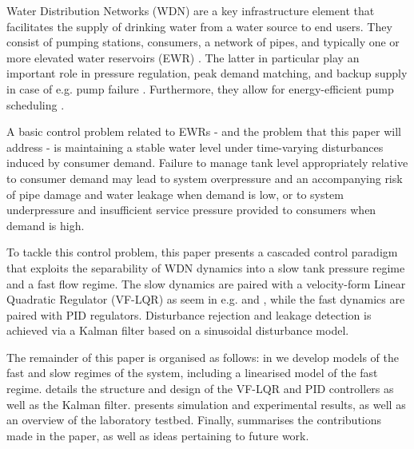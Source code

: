 
Water Distribution Networks (WDN) are a key infrastructure element that facilitates the supply of drinking water from a water source to end users. They consist of pumping stations, consumers, a network of pipes, and typically one or more elevated water reservoirs (EWR) \cite{Swamee2008}. The latter in particular play an important role in pressure regulation, peak demand matching, and backup supply in case of e.g. pump failure \cite{Val2020,Creaco2019}. Furthermore, they allow for energy-efficient pump scheduling \cite{Rathore1030,Bello2019}.  

A basic control problem related to EWRs - and the problem that this paper will address - is maintaining a stable water level under time-varying disturbances induced by consumer demand. Failure to manage tank level appropriately relative to consumer demand may lead to system overpressure and an accompanying risk of pipe damage and water leakage when demand is low, or to system underpressure and insufficient service pressure provided to consumers when demand is high. 

To tackle this control problem, this paper presents a cascaded control paradigm that exploits the separability of WDN dynamics into a slow tank pressure regime and a fast flow regime. The slow dynamics are paired with a velocity-form Linear Quadratic Regulator (VF-LQR) as seem in e.g. \cite{Pannocchia2001,Pannocchia2015a} and \cite{Ruscio2012}, while the fast dynamics are paired with PID regulators. Disturbance rejection and leakage detection is achieved via a Kalman filter based on a sinusoidal disturbance model.

The remainder of this paper is organised as follows: in  we develop models of the fast and slow regimes of the system, including a linearised model of the fast regime.  details the structure and design of the VF-LQR and PID controllers as well as the Kalman filter.  presents simulation and experimental results, as well as an overview of the laboratory testbed. Finally,  summarises the contributions made in the paper, as well as ideas pertaining to future work.